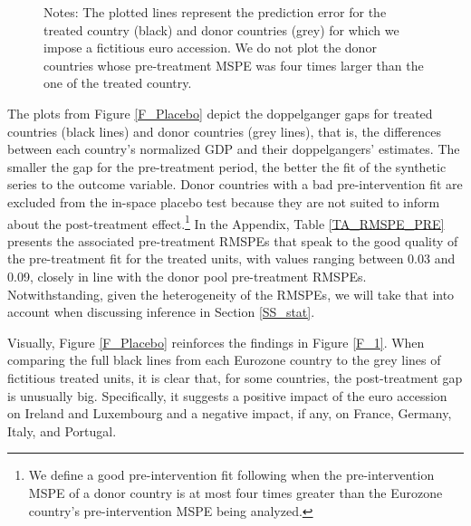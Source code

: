 \documentclass[12pt]{article}
\newcommand{\annote}[1]{\parbox{\textwidth}{\renewcommand{\baselinestretch}{1.0}\vspace{12pt} \small Notes: #1}}
\begin{document}
\begin{figure}[h!]
		 \vspace{-1em}
		\annote{\footnotesize The plotted lines represent the prediction error for the treated country (black) and donor countries (grey) for which we impose a fictitious euro accession. We do not plot the donor countries whose pre-treatment MSPE was four times larger than the one of the treated country.}
\end{figure}

The plots from Figure \ref{F_Placebo} depict the doppelganger gaps for treated countries (black lines) and donor countries (grey lines), that is, the differences between each country's normalized GDP and their doppelgangers' estimates. The smaller the gap for the pre-treatment period, the better the fit of the synthetic series to the outcome variable. Donor countries with a bad pre-intervention fit are excluded from the in-space placebo test because they are not suited to inform about the post-treatment effect.\footnote{We define a good pre-intervention fit following \cite{Firpo2018} when the pre-intervention MSPE of a donor country is at most four times greater than the Eurozone country’s pre-intervention MSPE being analyzed.}  In the Appendix, Table \ref{TA_RMSPE_PRE} presents the associated pre-treatment RMSPEs that speak to the good quality of the pre-treatment fit for the treated units, with values ranging between 0.03 and 0.09, closely in line with the donor pool pre-treatment RMSPEs. Notwithstanding, given the heterogeneity of the RMSPEs, we will take that into account when discussing inference in Section \ref{SS_stat}.

Visually, Figure \ref{F_Placebo} reinforces the findings in Figure \ref{F_1}. When comparing the full black lines from each Eurozone country to the grey lines of fictitious treated units, it is clear that,  for some countries, the post-treatment gap is unusually big. Specifically, it suggests a positive impact of the euro accession on Ireland and Luxembourg and a negative impact, if any, on France, Germany, Italy, and Portugal.
\end{document}
